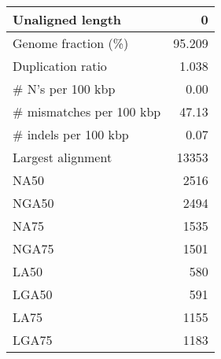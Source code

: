 \documentclass[12pt,a4paper]{article}
\begin{document}
\begin{table}[ht]
\begin{center}
\begin{tabular}{|l*{1}{|r}|}
Unaligned length & 0 \\ \hline
Genome fraction (\%) & 95.209 \\ \hline
Duplication ratio & 1.038 \\ \hline
\# N's per 100 kbp & 0.00 \\ \hline
\# mismatches per 100 kbp & 47.13 \\ \hline
\# indels per 100 kbp & 0.07 \\ \hline
Largest alignment & 13353 \\ \hline
NA50 & 2516 \\ \hline
NGA50 & 2494 \\ \hline
NA75 & 1535 \\ \hline
NGA75 & 1501 \\ \hline
LA50 & 580 \\ \hline
LGA50 & 591 \\ \hline
LA75 & 1155 \\ \hline
LGA75 & 1183 \\ \hline
\end{tabular}
\end{center}
\end{table}
\end{document}
